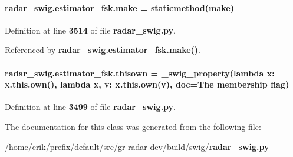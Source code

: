 \paragraph[{make}]{\setlength{\rightskip}{0pt plus 5cm}radar\+\_\+swig.\+estimator\+\_\+fsk.\+make = staticmethod(make)\hspace{0.3cm}{\ttfamily [static]}}\label{classradar__swig_1_1estimator__fsk_a77cf61c0ccd66e51a6b1ad20717e29ea}


Definition at line {\bf 3514} of file {\bf radar\+\_\+swig.\+py}.



Referenced by {\bf radar\+\_\+swig.\+estimator\+\_\+fsk.\+make()}.

\paragraph[{thisown}]{\setlength{\rightskip}{0pt plus 5cm}radar\+\_\+swig.\+estimator\+\_\+fsk.\+thisown = {\bf \+\_\+swig\+\_\+property}(lambda x\+: x.\+this.\+own(), lambda {\bf x}, v\+: x.\+this.\+own(v), doc=\textquotesingle{}The membership flag\textquotesingle{})\hspace{0.3cm}{\ttfamily [static]}}\label{classradar__swig_1_1estimator__fsk_aec70225a438f830df5e3f156bb196075}


Definition at line {\bf 3499} of file {\bf radar\+\_\+swig.\+py}.



The documentation for this class was generated from the following file\+:\begin{DoxyCompactItemize}
\item 
/home/erik/prefix/default/src/gr-\/radar-\/dev/build/swig/{\bf radar\+\_\+swig.\+py}\end{DoxyCompactItemize}
